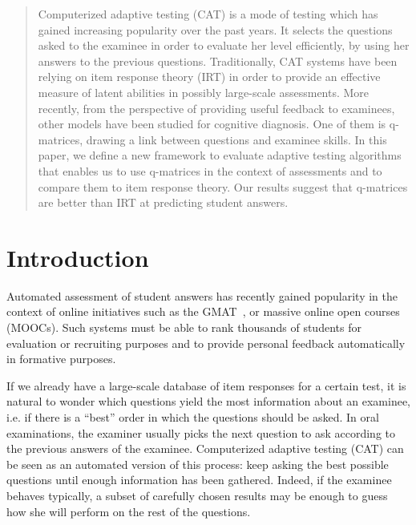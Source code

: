 \documentclass{sig-alternate}
\begin{document}
\maketitle
\begin{abstract}
Computerized adaptive testing (CAT) is a mode of testing which has gained increasing popularity over the past years. It selects the questions asked to the examinee in order to evaluate her level efficiently, by using her answers to the previous questions.
Traditionally, CAT systems have been relying on item response theory (IRT) in order to provide an effective measure of latent abilities in possibly large-scale assessments.
More recently, from the perspective of providing useful feedback to examinees, other models have been studied for cognitive diagnosis. One of them is q-matrices, drawing a link between questions and examinee skills.
In this paper, we define a new framework to evaluate adaptive testing algorithms that enables us to use q-matrices in the context of assessments and to compare them to item response theory.
Our results suggest that q-matrices are better than IRT at predicting student answers.
\end{abstract}




\newpage

\section{Introduction}
Automated assessment of student answers has recently gained popularity in the context of online initiatives such as the GMAT~\citep{Rudner2010}, or massive online open courses (MOOCs). Such systems must be able to rank thousands of students for evaluation or recruiting purposes and to provide personal feedback automatically in formative purposes.

If we already have a large-scale database of item responses for a certain test, it is natural to wonder which questions yield the most information about an examinee, i.e. if there is a ``best'' order in which the questions should be asked. In oral examinations, the examiner usually picks the next question to ask according to the previous answers of the examinee. Computerized adaptive testing (CAT) can be seen as an automated version of this process: keep asking the best possible questions until enough information has been gathered. Indeed, if the examinee behaves typically, a subset of carefully chosen results may be enough to guess how she will perform on the rest of the questions.
\end{document}
